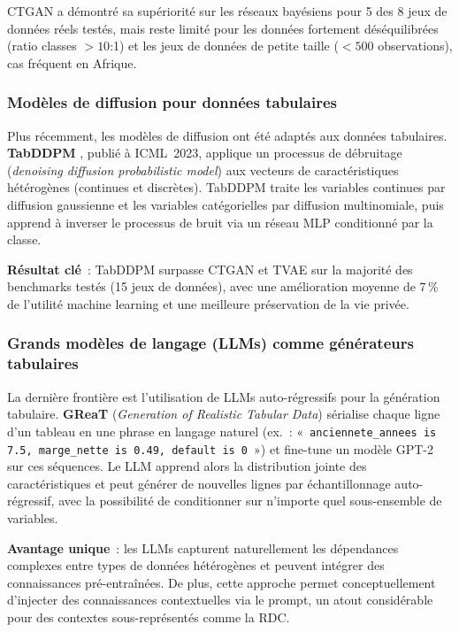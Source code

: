 \documentclass[12pt, a4paper, twocolumn]{article}
\begin{document}
CTGAN a démontré sa supériorité sur les réseaux bayésiens pour 5 des 8 jeux de données réels testés, mais reste limité pour les données fortement déséquilibrées (ratio classes $>10$:1) et les jeux de données de petite taille ($<500$ observations), cas fréquent en Afrique.

\subsubsection{Modèles de diffusion pour données tabulaires}
\label{subsubsec:synth_diff}

Plus récemment, les modèles de diffusion ont été adaptés aux données tabulaires. \textbf{TabDDPM} \cite{kotelnikov2023}, publié à ICML~2023, applique un processus de débruitage (\textit{denoising diffusion probabilistic model}) aux vecteurs de caractéristiques hétérogènes (continues et discrètes). TabDDPM traite les variables continues par diffusion gaussienne et les variables catégorielles par diffusion multinomiale, puis apprend à inverser le processus de bruit via un réseau MLP conditionné par la classe.

\textbf{Résultat clé}~: TabDDPM surpasse CTGAN et TVAE sur la majorité des benchmarks testés (15 jeux de données), avec une amélioration moyenne de 7\,\% de l'utilité machine learning et une meilleure préservation de la vie privée.

\subsubsection{Grands modèles de langage (LLMs) comme générateurs tabulaires}
\label{subsubsec:synth_llm}

La dernière frontière est l'utilisation de LLMs auto-régressifs pour la génération tabulaire. \textbf{GReaT} (\textit{Generation of Realistic Tabular Data}) \cite{borisov2023} sérialise chaque ligne d'un tableau en une phrase en langage naturel (ex.~: «~\texttt{anciennete\_annees is 7.5, marge\_nette is 0.49, default is 0}~») et fine-tune un modèle GPT-2 sur ces séquences. Le LLM apprend alors la distribution jointe des caractéristiques et peut générer de nouvelles lignes par échantillonnage auto-régressif, avec la possibilité de conditionner sur n'importe quel sous-ensemble de variables.

\textbf{Avantage unique}~: les LLMs capturent naturellement les dépendances complexes entre types de données hétérogènes et peuvent intégrer des connaissances pré-entraînées. De plus, cette approche permet conceptuellement d'injecter des connaissances contextuelles via le prompt, un atout considérable pour des contextes sous-représentés comme la RDC.
\end{document}
